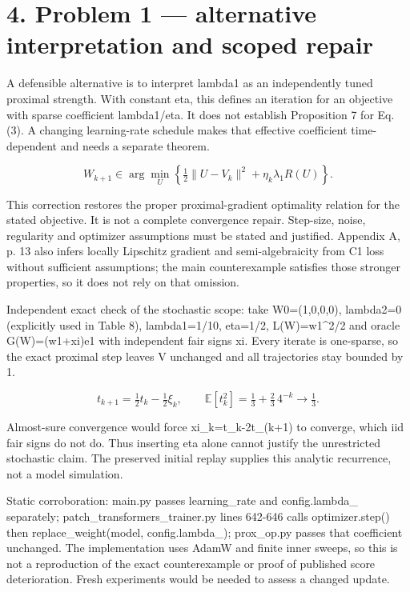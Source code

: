 \documentclass[10pt]{article}
\begin{document}
\section*{4. Problem 1 — alternative interpretation and scoped repair}
A defensible alternative is to interpret lambda1 as an independently tuned proximal strength. With constant eta, this defines an iteration for an objective with sparse coefficient lambda1/eta. It does not establish Proposition 7 for Eq. (3). A changing learning-rate schedule makes that effective coefficient time-dependent and needs a separate theorem.\par
\[W_{k+1}\in\arg\min_U\left\{\tfrac12\|U-V_k\|^2+\eta_k\lambda_1R(U)\right\}.\]\par
This correction restores the proper proximal-gradient optimality relation for the stated objective. It is not a complete convergence repair. Step-size, noise, regularity and optimizer assumptions must be stated and justified. Appendix A, p. 13 also infers locally Lipschitz gradient and semi-algebraicity from C1 loss without sufficient assumptions; the main counterexample satisfies those stronger properties, so it does not rely on that omission.\par
Independent exact check of the stochastic scope: take W0=(1,0,0,0), lambda2=0 (explicitly used in Table 8), lambda1=1/10, eta=1/2, L(W)=w1\textasciicircum{}2/2 and oracle G(W)=(w1+xi)e1 with independent fair signs xi. Every iterate is one-sparse, so the exact proximal step leaves V unchanged and all trajectories stay bounded by 1.\par
\[t_{k+1}=\tfrac12t_k-\tfrac12\xi_k,\qquad\mathbb E[t_k^2]=\tfrac13+\tfrac23\,4^{-k}\longrightarrow\tfrac13.\]\par
Almost-sure convergence would force xi\_k=t\_k-2t\_(k+1) to converge, which iid fair signs do not do. Thus inserting eta alone cannot justify the unrestricted stochastic claim. The preserved initial replay supplies this analytic recurrence, not a model simulation.\par
Static corroboration: main.py passes learning\_rate and config.lambda\_ separately; patch\_transformers\_trainer.py lines 642-646 calls optimizer.step() then replace\_weight(model, config.lambda\_); prox\_op.py passes that coefficient unchanged. The implementation uses AdamW and finite inner sweeps, so this is not a reproduction of the exact counterexample or proof of published score deterioration. Fresh experiments would be needed to assess a changed update.\par
\end{document}
